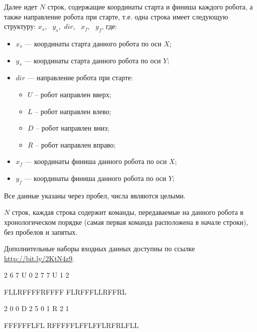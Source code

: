 Далее идет $N$ строк, содержащие координаты старта и финиша каждого робота, а также
направление робота при старте, т.е. одна строка имеет следующую структуру:
$x_s$,~ $y_s$,~$dir$,~ $x_f$,~ $y_f$, где:
\begin{itemize}
    \item $x_s$ --- координаты старта данного робота по оси $X$;
    \item $y_s$ --- координаты старта данного робота по оси $Y$;
    \item $dir$ --- направление робота при старте:
        \begin{itemize}
            \item $U$ -- робот направлен вверх;
            \item $L$ -- робот направлен влево;
            \item $D$ -- робот направлен вниз;
            \item $R$ -- робот направлен вправо;
        \end{itemize}
    \item $x_f$ --- координаты финиша данного робота по оси $X$;
    \item $y_f$ --- координаты финиша данного робота по оси $Y$;
\end{itemize}

Все данные указаны через пробел, числа являются целыми.


\outputfmtSection

$N$ строк, каждая строка содержит команды, передаваемые на данного робота в хронологическом порядке
(самая первая команда расположена в начале строки), без пробелов и запятых.


\commentsSection

Дополнительные наборы входных данных доступны по ссылке \url{http://bit.ly/2KtN4z9}.

\exampleSection


\begin{myverbbox}[\small]{\vinput}
    2
    6 7 U 0 2
    7 7 U 1 2
\end{myverbbox}
\begin{myverbbox}[\small]{\voutput}
    FLLRFFFFRFFFF
    FLRFFFLLRFFRL
\end{myverbbox}


\begin{myverbbox}[\small]{\vinput}
    2
    0 0 D 2 5
    0 1 R 2 1
\end{myverbbox}
\begin{myverbbox}[\small]{\voutput}
    FFFFFFLFL
    RFFFFFLFFLFFLRFRLFLL
\end{myverbbox}




